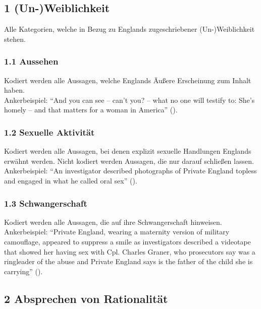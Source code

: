 \documentclass[12pt, titlepage=true, toc=bib]{scrartcl}
\begin{document}
{}

\newpage

\subsection*{1 (Un-)Weiblichkeit}

Alle Kategorien, welche in Bezug zu Englands zugeschriebener (Un-)Weiblichkeit stehen.

\subsubsection*{1.1 Aussehen}

Kodiert werden alle Aussagen, welche Englands Äußere Erscheinung zum Inhalt haben.\\
Ankerbeispiel: "`And you can see -- can't you? -- what no one will testify to: She's homely -- and that matters for a woman in America"' (\cite[1]{cohen_victimizer_2005}).

\subsubsection*{1.2 Sexuelle Aktivität}

Kodiert werden alle Aussagen, bei denen explizit sexuelle Handlungen Englands erwähnt werden. Nicht kodiert werden Aussagen, die nur darauf schließen lassen.\\
Ankerbeispiel: "`An investigator described photographs of Private England topless and engaged in what he called oral sex"' (\cite[2]{zernike_conflict_2004}).

\subsubsection*{1.3 Schwangerschaft}

Kodiert werden alle Aussagen, die auf ihre Schwangerschaft hinweisen.\\
Ankerbeispiel: "`Private England, wearing a maternity version of military camouflage, appeared to suppress a smile as investigators described a videotape that showed her having sex with Cpl. Charles Graner, who prosecutors say was a ringleader of the abuse and Private England says is the father of the child she is carrying"' (\cite[2]{zernike_conflict_2004}).

\subsection*{2 Absprechen von Rationalität}
\end{document}
